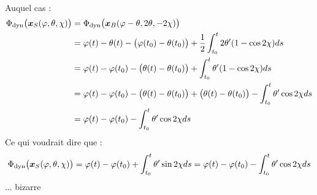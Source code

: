 \begin{annexe}
\begin{align*}
\end{align*}
Auquel cas :
\begin{align*}
	\Phi_{\text{\normalfont dyn}}\big(\boldsymbol{x}_S(\varphi, \theta, \chi) \big) &= \Phi_{\text{\normalfont dyn}}\big(\boldsymbol{x}_B(\varphi-\theta, 2\theta, -2\chi) \big) \\
	&= \varphi(t) - \theta(t) - \big( \varphi(t_0) - \theta(t_0) \big) + \frac{1}{2} \int_{t_0}^t 2\theta' (1 - \cos2\chi)ds \\
	&= \varphi(t) - \varphi(t_0) - \big( \theta(t) - \theta(t_0) \big) + \int_{t_0}^t \theta' (1 - \cos2\chi)ds \\
	&= \varphi(t) - \varphi(t_0) - \big( \theta(t) - \theta(t_0) \big) + \big( \theta(t) - \theta(t_0) \big) - \int_{t_0}^t \theta' \cos2\chi ds \\
	&= \varphi(t) - \varphi(t_0) - \int_{t_0}^t \theta' \cos2\chi ds
\end{align*}
Ce qui voudrait dire que :
\[\Phi_{\text{\normalfont dyn}}\big(\boldsymbol{x}_S(\varphi, \theta, \chi) \big) = \varphi(t) - \varphi(t_0) + \int_{t_0}^t \theta' \sin2\chi ds = \varphi(t) - \varphi(t_0) - \int_{t_0}^t \theta' \cos2\chi ds\]
... bizarre


\end{annexe}